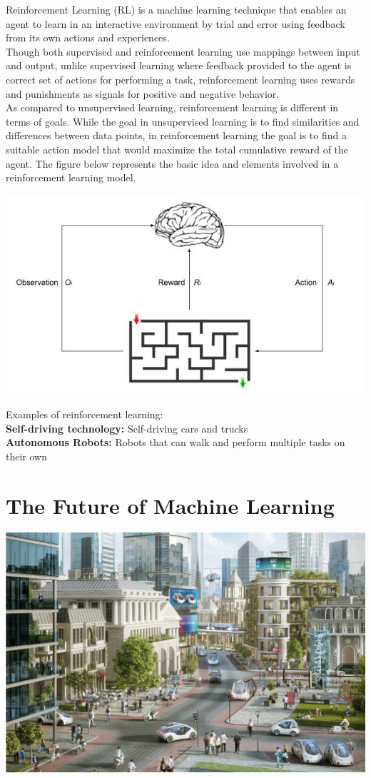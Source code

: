 \documentclass{42-en}
\begin{document}
Reinforcement Learning (RL) is a machine learning technique that enables an agent to learn in an interactive environment by trial and error using feedback from its own actions and experiences.\\
Though both supervised and reinforcement learning use mappings between input and output, unlike supervised learning where feedback provided to the agent is correct set of actions for performing a task, reinforcement learning uses rewards and punishments as signals for positive and negative behavior.\\
As compared to unsupervised learning, reinforcement learning is different in terms of goals. While the goal in unsupervised learning is to find similarities and differences between data points, in reinforcement learning the goal is to find a suitable action model that would maximize the total cumulative reward of the agent. The figure below represents the basic idea and elements involved in a reinforcement learning model.\\
\centerline{\includegraphics[width=150mm]{images/basic_ml.jpeg}}
Examples of reinforcement learning:\\
\textbf{Self-driving technology:}  Self-driving cars and trucks\\
\textbf{Autonomous Robots:}  Robots that can walk and perform multiple tasks on their own

\section*{The Future of Machine Learning}

\centerline{\includegraphics[width=150mm]{images/news-transport-july17-bosch3d.png}}
\end{document}
